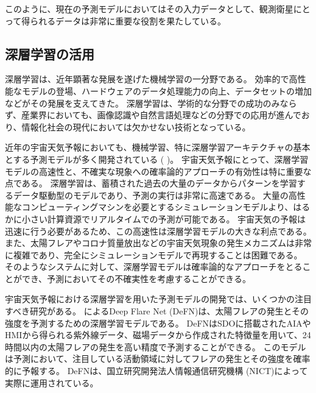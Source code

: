   このように、現在の予測モデルにおいてはその入力データとして、観測衛星にとって得られるデータは非常に重要な役割を果たしている。

  \subsection{深層学習の活用}
    深層学習は、近年顕著な発展を遂げた機械学習の一分野である。
    効率的で高性能なモデルの登場、ハードウェアのデータ処理能力の向上、データセットの増加などがその発展を支えてきた。
    深層学習は、学術的な分野での成功のみならず、産業界においても、画像認識や自然言語処理などの分野での応用が進んでおり、情報化社会の現代においては欠かせない技術となっている。

    近年の宇宙天気予報においても、機械学習、特に深層学習アーキテクチャの基本とする予測モデルが多く開発されている ( )。
    宇宙天気予報にとって、深層学習モデルの高速性と、不確実な現象への確率論的アプローチの有効性は特に重要な点である。
    深層学習は、蓄積された過去の大量のデータからパターンを学習するデータ駆動型のモデルであり、予測の実行は非常に高速である。
    大量の高性能なコンピューティングマシンを必要とするシミュレーションモデルより、はるかに小さい計算資源でリアルタイムでの予測が可能である。
    宇宙天気の予報は迅速に行う必要があるため、この高速性は深層学習モデルの大きな利点である。
    また、太陽フレアやコロナ質量放出などの宇宙天気現象の発生メカニズムは非常に複雑であり、完全にシミュレーションモデルで再現することは困難である。
    そのようなシステムに対して、深層学習モデルは確率論的なアプローチをとることができ、予測においてその不確実性を考慮することができる。

    宇宙天気予報における深層学習を用いた予測モデルの開発では、いくつかの注目すべき研究がある。
    によるDeep Flare Net (DeFN)は、太陽フレアの発生とその強度を予測するための深層学習モデルである。
    DeFNはSDOに搭載されたAIAやHMIから得られる紫外線データ、磁場データから作成された特徴量を用いて、24時間以内の太陽フレアの発生を高い精度で予測することができる。
    このモデルは予測において、注目している活動領域に対してフレアの発生とその強度を確率的に予報する。
    DeFNは、国立研究開発法人情報通信研究機構 (NICT)によって実際に運用されている。

